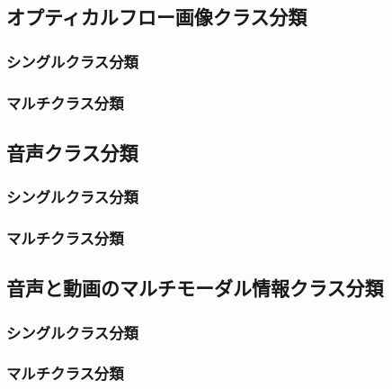 \subsection{オプティカルフロー画像クラス分類}
\subsubsection{シングルクラス分類}
\subsubsection{マルチクラス分類}
\subsection{音声クラス分類}
\subsubsection{シングルクラス分類}
\subsubsection{マルチクラス分類}
\subsection{音声と動画のマルチモーダル情報クラス分類}
\subsubsection{シングルクラス分類}
\subsubsection{マルチクラス分類}
